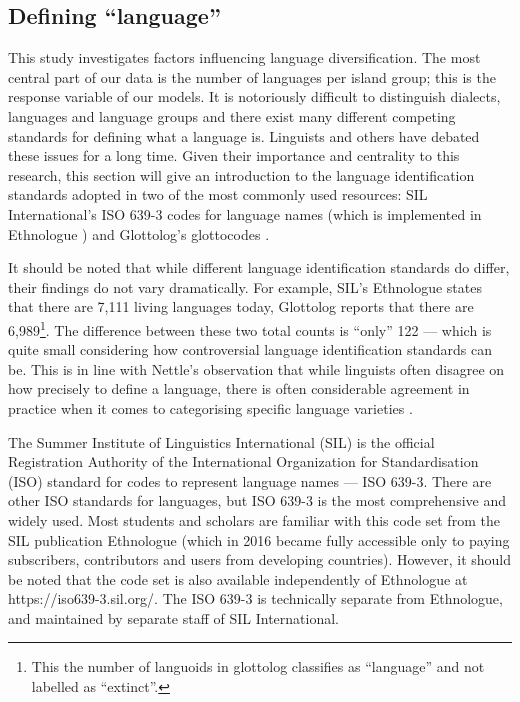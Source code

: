 \documentclass[unnumsec,webpdf,modern,medium]{oup-authoring-template}
\begin{document}
\begin{appendices}
\subsection{Defining ``language''}
\label{sec:language_class}
This study investigates factors influencing language diversification. The most central part of our data is the number of languages per island group; this is the response variable of our models. It is notoriously difficult to distinguish dialects, languages and language groups and there exist many different competing standards for defining what a language is. Linguists and others have debated these issues for a long time. Given their importance and centrality to this research, this section will give an introduction to the language identification standards adopted in two of the most commonly used resources: SIL International's ISO 639-3 codes for language names (which is implemented in Ethnologue \citep{ethnologue22}) and Glottolog's glottocodes \citet{glottolog3}.

It should be noted that while different language identification standards do differ, their findings do not vary dramatically. For example, SIL's Ethnologue states that there are 7,111 living languages today, Glottolog reports that there are 6,989\footnote{This the number of languoids in glottolog classifies as ``language'' and not labelled as ``extinct''.}. The difference between these two total counts is ``only'' 122 --- which is quite small considering how controversial language identification standards can be. This is in line with Nettle's observation that while linguists often disagree on how precisely to define a language, there is often considerable agreement in practice when it comes to categorising specific language varieties \citep[356]{NETTLE1998}.

The Summer Institute of Linguistics International (SIL) is the official Registration Authority of the International Organization for Standardisation (ISO) standard for codes to represent language names --- ISO 639-3. There are other ISO standards for languages, but ISO 639-3 is the most comprehensive and widely used. Most students and scholars are familiar with this code set from the SIL publication Ethnologue (which in 2016 became fully accessible only to paying subscribers, contributors and users from developing countries). However, it should be noted that the code set is also available independently of Ethnologue at https://iso639-3.sil.org/. The ISO 639-3 is technically separate from Ethnologue, and maintained by separate staff of SIL International.


\end{appendices}
\end{document}
